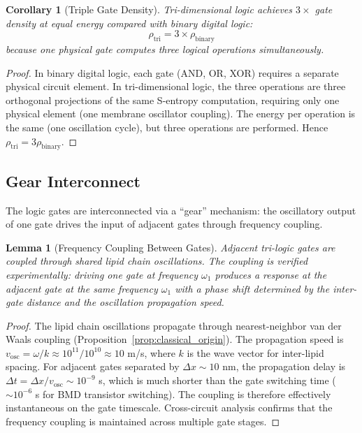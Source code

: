 \documentclass[twocolumn,10pt,a4paper]{article}
\newtheorem{lemma}[theorem]{Lemma}
\newtheorem{corollary}[theorem]{Corollary}
\theoremstyle{definition}
\theoremstyle{remark}
\begin{document}
\begin{corollary}[Triple Gate Density]
\label{cor:density}
Tri-dimensional logic achieves $3\times$ gate density at equal energy compared with binary digital logic:
\begin{equation}
\label{eq:density}
\rho_{\mathrm{tri}} = 3 \times \rho_{\mathrm{binary}}
\end{equation}
because one physical gate computes three logical operations simultaneously.
\end{corollary}

\begin{proof}
In binary digital logic, each gate (AND, OR, XOR) requires a separate physical circuit element. In tri-dimensional logic, the three operations are three orthogonal projections of the same S-entropy computation, requiring only one physical element (one membrane oscillator coupling). The energy per operation is the same (one oscillation cycle), but three operations are performed. Hence $\rho_{\mathrm{tri}} = 3 \rho_{\mathrm{binary}}$. \qedhere
\end{proof}

\subsection{Gear Interconnect}

The logic gates are interconnected via a ``gear'' mechanism: the oscillatory output of one gate drives the input of adjacent gates through frequency coupling.

\begin{lemma}[Frequency Coupling Between Gates]
\label{lem:gear}
Adjacent tri-logic gates are coupled through shared lipid chain oscillations. The coupling is verified experimentally: driving one gate at frequency $\omega_1$ produces a response at the adjacent gate at the same frequency $\omega_1$ with a phase shift determined by the inter-gate distance and the oscillation propagation speed.
\end{lemma}

\begin{proof}
The lipid chain oscillations propagate through nearest-neighbor van der Waals coupling (Proposition~\ref{prop:classical_origin}). The propagation speed is $v_{\mathrm{osc}} = \omega / k \approx 10^{11} / 10^{10} \approx 10$ m/s, where $k$ is the wave vector for inter-lipid spacing. For adjacent gates separated by $\Delta x \sim 10$ nm, the propagation delay is $\Delta t = \Delta x / v_{\mathrm{osc}} \sim 10^{-9}$ s, which is much shorter than the gate switching time ($\sim 10^{-6}$ s for BMD transistor switching). The coupling is therefore effectively instantaneous on the gate timescale. Cross-circuit analysis confirms that the frequency coupling is maintained across multiple gate stages. \qedhere
\end{proof}
\end{document}
